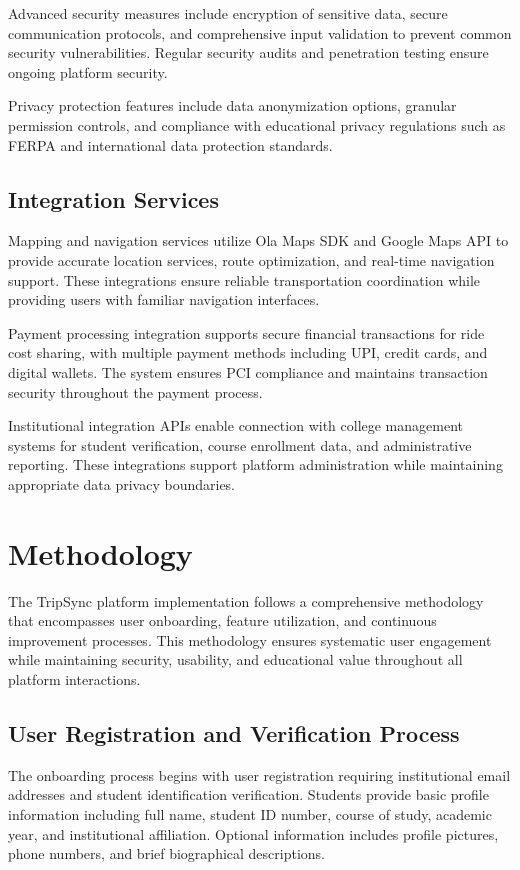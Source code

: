 \documentclass[conference]{IEEEtran}
\begin{document}
Advanced security measures include encryption of sensitive data, secure communication protocols, and comprehensive input validation to prevent common security vulnerabilities. Regular security audits and penetration testing ensure ongoing platform security.

Privacy protection features include data anonymization options, granular permission controls, and compliance with educational privacy regulations such as FERPA and international data protection standards.

\subsection{Integration Services}

Mapping and navigation services utilize Ola Maps SDK and Google Maps API to provide accurate location services, route optimization, and real-time navigation support. These integrations ensure reliable transportation coordination while providing users with familiar navigation interfaces.

Payment processing integration supports secure financial transactions for ride cost sharing, with multiple payment methods including UPI, credit cards, and digital wallets. The system ensures PCI compliance and maintains transaction security throughout the payment process.

Institutional integration APIs enable connection with college management systems for student verification, course enrollment data, and administrative reporting. These integrations support platform administration while maintaining appropriate data privacy boundaries.

\section{Methodology}

The TripSync platform implementation follows a comprehensive methodology that encompasses user onboarding, feature utilization, and continuous improvement processes. This methodology ensures systematic user engagement while maintaining security, usability, and educational value throughout all platform interactions.

\subsection{User Registration and Verification Process}

The onboarding process begins with user registration requiring institutional email addresses and student identification verification. Students provide basic profile information including full name, student ID number, course of study, academic year, and institutional affiliation. Optional information includes profile pictures, phone numbers, and brief biographical descriptions.
\end{document}
